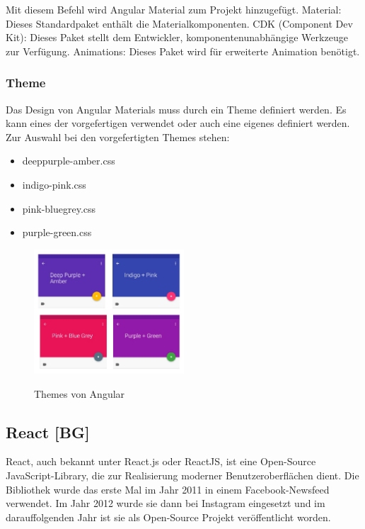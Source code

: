 Mit diesem Befehl wird Angular Material zum Projekt hinzugefügt.
Material: Dieses Standardpaket enthält die Materialkomponenten.
CDK (Component Dev Kit): Dieses Paket stellt dem Entwickler, komponentenunabhängige Werkzeuge zur Verfügung.
Animations:  Dieses Paket wird für erweiterte Animation benötigt.

\subsubsection{Theme}
Das Design von Angular Materials muss durch ein Theme definiert werden. Es kann eines der vorgefertigen verwendet oder auch eine eigenes definiert werden. Zur Auswahl bei den vorgefertigten Themes stehen:

\begin{itemize}
  \item deeppurple-amber.css
  \item indigo-pink.css
  \item pink-bluegrey.css
  \item purple-green.css
\end{itemize}
\cite{AngularMaterials}
\begin{figure}[H]
  \centering
  \includegraphics[width=0.5\textwidth]{pics/Themes.png}
  \caption{Themes von Angular}
  \cite{AngularThemePic}
\end{figure}

\subsection{React [BG]}
React, auch bekannt unter React.js oder ReactJS, ist eine Open-Source JavaScript-Library, die zur Realisierung moderner Benutzeroberflächen dient. Die Bibliothek wurde das erste Mal im Jahr 2011 in einem Facebook-Newsfeed verwendet. Im Jahr 2012 wurde sie dann bei Instagram eingesetzt und im darauffolgenden Jahr ist sie als Open-Source Projekt veröffentlicht worden. 

